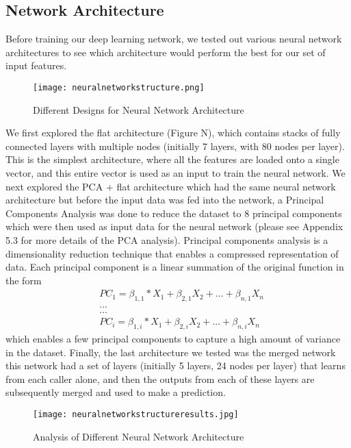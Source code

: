 \documentclass{article}
\begin{document}
\subsection{Network Architecture}
Before training our deep learning network, we tested out various neural network architectures to see which architecture would perform the best for our set of input features.  
\begin{figure}[H]
\texttt{[image: neuralnetworkstructure.png]}
\centering
\caption{Different Designs for Neural Network Architecture}
\end{figure}
We first explored the flat architecture (Figure N), which contains stacks of fully connected layers with multiple nodes (initially 7 layers, with 80 nodes per layer). This is the simplest architecture, where all the features are loaded onto a single vector, and this entire vector is used as an input to train the neural network. We next explored the PCA + flat architecture which had the same neural network architecture but before the input data was fed into the network, a Principal Components Analysis was done to reduce the dataset to 8 principal components which were then used as input data for the neural network (please see Appendix 5.3 for more details of the PCA analysis). Principal components analysis is a dimensionality reduction technique that enables a compressed representation of data. Each principal component is a linear summation of the original function in the form 
\begin{align*}
&PC_1 = \beta_{1,1}*X_{1} + \beta_{2,1} X_{2} +... + \beta_{n,1} X_n \\
&... \\
&... \\
&PC_i = \beta_{1,i}*X_{1} + \beta_{2,i} X_{2} +... + \beta_{n,i} X_n
\end{align*}
which enables a few principal components to capture a high amount of variance in the dataset.
Finally, the last architecture we tested was the merged network this network had a set of layers (initially 5 layers, 24 nodes per layer) that learns from each caller alone, and then the outputs from each of these layers are subsequently merged and used to make a prediction. 
\begin{figure}[H]
\texttt{[image: neuralnetworkstructureresults.jpg]}
\centering
\caption{Analysis of Different Neural Network Architecture}
\end{figure}
\end{document}
